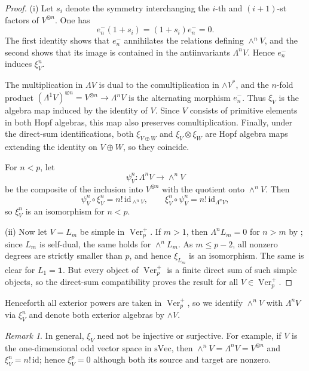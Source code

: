 \documentclass[12pt]{amsart}
\theoremstyle{remark}
\newtheorem{remark}[theorem]{Remark}
\DeclareMathOperator{\Ver}{Ver}
\newcommand{\one}{\mathbf 1}
\begin{document}
\begin{proof}
(i) Let $s_i$ denote the symmetry interchanging the $i$-th and $(i+1)$-st
factors of $V^{\otimes n}$.  One has
\[
 e_n^-(1+s_i)=
 (1+s_i)e_n^-=0.
\]
The first identity shows that $e_n^-$ annihilates the relations defining
$\wedge^nV$, and the second shows that its image is contained in the
antiinvariants $\Lambda^nV$.  Hence $e_n^-$ induces $\xi_V^n$.

The multiplication in $\Lambda V$ is dual to the comultiplication in
$\wedge V^*$, and the $n$-fold product $(\Lambda^1V)^{\otimes n}=V^{\otimes n}\to \Lambda^n V$ is the
alternating morphism $e_n^-$.  Thus $\xi_V$ is the algebra map induced by the
identity of $V$.  Since $V$ consists of primitive elements in both Hopf
algebras, this map also preserves comultiplication. Finally, under the direct-sum identifications, both
$\xi_{V\oplus W}$ and $\xi_V\otimes\xi_W$ are Hopf algebra maps extending the
identity on $V\oplus W$, so they coincide.

For $n<p$, let
\[
 \psi_V^n:\Lambda^nV\longrightarrow\wedge^nV
\]
be the composite of the inclusion into $V^{\otimes n}$ with the quotient onto
$\wedge^nV$.  Then
\[
 \psi_V^n\circ \xi_V^n=n!\,\mathrm{id}_{\wedge^nV},
 \qquad
 \xi_V^n\circ \psi_V^n=n!\,\mathrm{id}_{\Lambda^nV},
\]
so $\xi_V^n$ is an isomorphism for $n<p$.

(ii) Now let $V=L_m$ be simple in $\Ver_p^+$.  If $m>1$, then
$\Lambda^nL_m=0$ for $n>m$ by \cite[Proposition~5.1]{Eti18}; since $L_m$ is
self-dual, the same holds for $\wedge^nL_m$.  As $m\leq p-2$, all nonzero degrees are
strictly smaller than $p$, and hence $\xi_{L_m}$ is an isomorphism.  The same
is clear for $L_1=\one$.  But every object of $\Ver_p^+$ is a finite direct sum of
such simple objects, so the direct-sum compatibility proves the result for
all $V\in\Ver_p^+$.
\end{proof}

Henceforth all exterior powers are taken in $\Ver_p^+$, 
so we identify $\wedge^nV$ with $\Lambda^nV$ via $\xi_V^n$ and
denote both exterior algebras by $\wedge V$.

\begin{remark}\label{rem:exterior-failure} In general, $\xi_V$ need not be injective or surjective.  For example, if
$V$ is the one-dimensional odd vector space in $\mathrm{sVec}$, then
$\wedge^nV=\Lambda^nV=V^{\otimes n}$ and $\xi_V^n=n!\,\mathrm{id}$; hence
$\xi_V^p=0$ although both its source and target are nonzero. 
 \end{remark}
\end{document}

